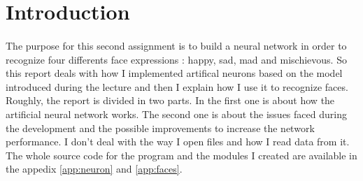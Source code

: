 \section*{Introduction}

    \paragraph{}{
        The purpose for this second assignment is to build a neural network in
     order to recognize four differents face expressions : happy, sad, mad and 
     mischievous. So this report deals with how I implemented artifical neurons
     based on the model introduced during the lecture and then I explain how I 
     use it to recognize faces. Roughly, the report is divided in two parts. 
     In the first one is about how the artificial neural network works. The
     second one is about the issues faced during the development and the 
     possible improvements to increase the network performance. \newline
     I don't deal with the way I open files and how I read data from it. The 
     whole source code for the program and the modules I created are available 
     in the appedix \ref{app:neuron} and \ref{app:faces}.
    }
